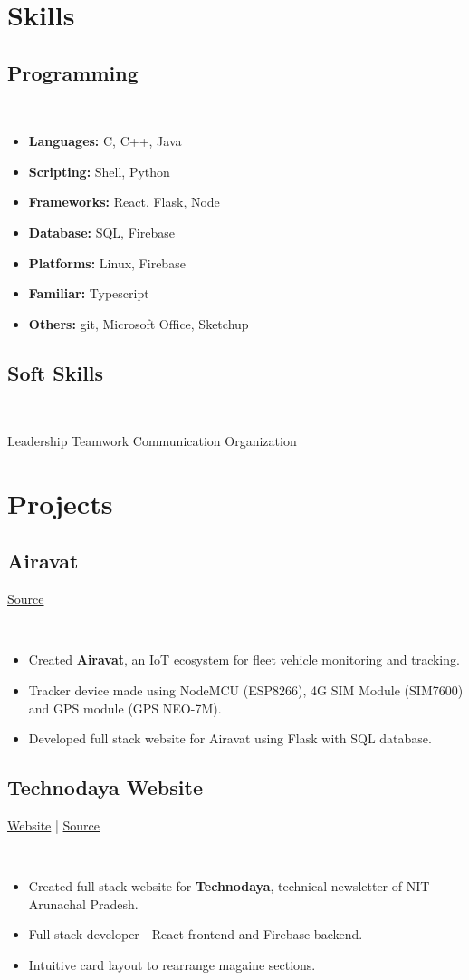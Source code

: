 \documentclass[]{article}
\newcommand{\subheading}[2]{
  {\subsection{#1}
  \hfill{#2}}\\
  \vspace{2pt}
}
\newenvironment{tightemize}{
\vspace{-\topsep}\begin{itemize}\itemsep1pt \parskip0pt \parsep0pt}
{\end{itemize}\vspace{-\topsep}}
\begin{document}
\begin{multicols}{2}
\begin{flushleft}
    \columnbreak

    
    \section{Skills}
    \subheading{Programming}{}
    \begin{tightemize}
      \item \textbf{Languages:} C, C++, Java
      \item \textbf{Scripting:} Shell, Python
      \item \textbf{Frameworks:} React, Flask, Node
      \item \textbf{Database:} SQL, Firebase
      \item \textbf{Platforms:} Linux, Firebase
      \item \textbf{Familiar:} Typescript
      \item \textbf{Others:} git, Microsoft Office, Sketchup
    \end{tightemize}

    \subheading{Soft Skills}{}
    Leadership \textbullet{} Teamwork \textbullet{} Communication \textbullet{} Organization

    \section{Projects}
    \subheading{Airavat}{\href{https://github.com/tripathics/airavat}{Source}}
    \begin{tightemize}
      \item Created \textbf{Airavat}, an IoT ecosystem for fleet vehicle monitoring and tracking.
      \item Tracker device made using NodeMCU (ESP8266), 4G SIM Module (SIM7600) and GPS module (GPS NEO-7M).
      \item Developed full stack website for Airavat using Flask with SQL database.
    \end{tightemize}

    \subheading{Technodaya Website}{
      \href{https://technodaya.netlify.app}{Website} | 
      \href{https://github.com/PursottamSah6003}{Source}
    }
    \begin{tightemize}
      \item Created full stack website for \textbf{Technodaya}, technical newsletter of NIT Arunachal Pradesh.
      \item Full stack developer - React frontend and Firebase backend.
      \item Intuitive card layout to rearrange magaine sections. 
    \end{tightemize}


\end{flushleft}
\end{multicols}
\end{document}
